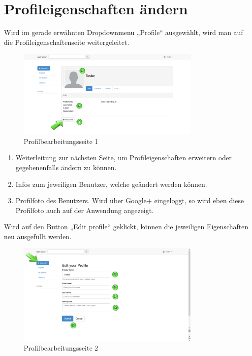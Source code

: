 \chapter{Profileigenschaften ändern}
Wird im gerade erwähnten Dropdownmenu „Profile“ ausgewählt, wird man auf die Profileigenschaftenseite weitergeleitet.

\begin{figure}[H]
    \centering
    \includegraphics[width=0.8\textwidth]{Bilder/9.png}
    \caption{Profilbearbeitungsseite 1}
    \label{fig:profilbearbeitungsseite1}
\end{figure}


\begin{enumerate}
\item Weiterleitung zur nächsten Seite, um Profileigenschaften erweitern oder gegebenenfalls ändern zu können.
\item Infos zum jeweiligen Benutzer, welche geändert werden können.
\item Profilfoto des Benutzers. Wird über Google+ eingeloggt, so wird eben diese Profilfoto auch auf der Anwendung angezeigt.
\end{enumerate}


Wird auf den Button „Edit profile“ geklickt, können die jeweiligen Eigenschaften neu ausgefüllt werden.

\begin{figure}[H]
    \centering
    \includegraphics[width=0.8\textwidth]{Bilder/10.png}
    \caption{Profilbearbeitungsseite 2 }
    \label{fig:profilbearbeitungsseite2}
\end{figure}


